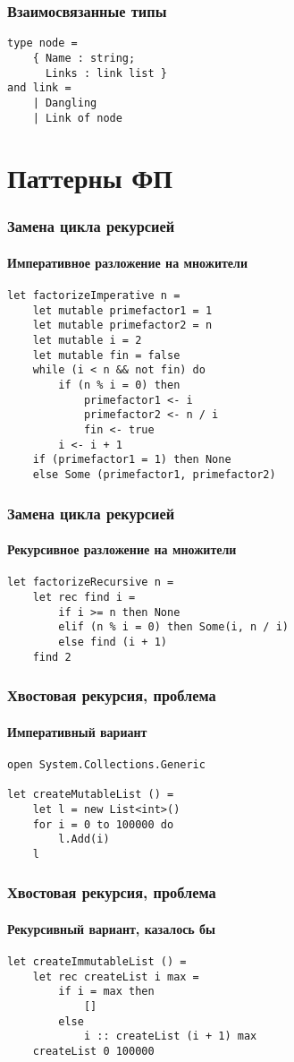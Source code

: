 \documentclass[xetex,mathserif,serif]{beamer}
\begin{document}
	\begin{frame}[fragile]
		\frametitle{Взаимосвязанные типы}
		\begin{verbatim}
type node =
    { Name : string;
      Links : link list }
and link =
    | Dangling
    | Link of node
		\end{verbatim}
	\end{frame}

	\section{Паттерны ФП}

	\begin{frame}[fragile]
		\frametitle{Замена цикла рекурсией}
		\framesubtitle{Императивное разложение на множители}
		\begin{verbatim}
let factorizeImperative n =
    let mutable primefactor1 = 1
    let mutable primefactor2 = n
    let mutable i = 2
    let mutable fin = false
    while (i < n && not fin) do
        if (n % i = 0) then
            primefactor1 <- i
            primefactor2 <- n / i
            fin <- true
        i <- i + 1
    if (primefactor1 = 1) then None
    else Some (primefactor1, primefactor2)
		\end{verbatim}
	\end{frame}

	\begin{frame}[fragile]
		\frametitle{Замена цикла рекурсией}
		\framesubtitle{Рекурсивное разложение на множители}
		\begin{verbatim}
let factorizeRecursive n =
    let rec find i =
        if i >= n then None
        elif (n % i = 0) then Some(i, n / i)
        else find (i + 1)
    find 2
		\end{verbatim}
	\end{frame}

	\begin{frame}[fragile]
		\frametitle{Хвостовая рекурсия, проблема}
		\framesubtitle{Императивный вариант}
		\begin{verbatim}
open System.Collections.Generic

let createMutableList () =
    let l = new List<int>()
    for i = 0 to 100000 do
        l.Add(i)
    l
		\end{verbatim}
	\end{frame}

	\begin{frame}[fragile]
		\frametitle{Хвостовая рекурсия, проблема}
		\framesubtitle{Рекурсивный вариант, казалось бы}
		\begin{verbatim}
let createImmutableList () =
    let rec createList i max =
        if i = max then
            []	
        else
            i :: createList (i + 1) max
    createList 0 100000
		\end{verbatim}
	\end{frame}
\end{document}
